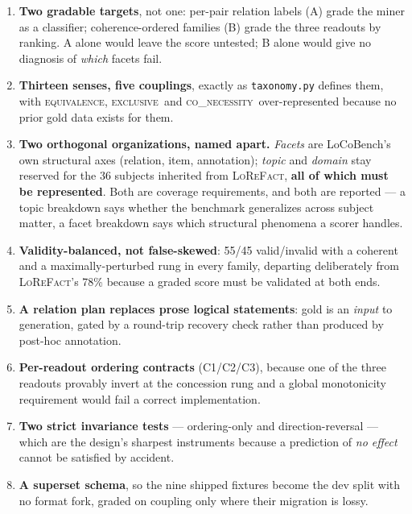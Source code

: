 \documentclass[11pt]{article}
\newcommand{\cEqv}{\textsc{equivalence}}
\newcommand{\cExc}{\textsc{exclusive}}
\newcommand{\cCoN}{\textsc{co\_necessity}}
\begin{document}
\begin{enumerate}[leftmargin=*,nosep,label=\arabic*.]
  \item \textbf{Two gradable targets}, not one: per-pair relation labels (A) grade the miner as
        a classifier; coherence-ordered families (B) grade the three readouts by ranking. A
        alone would leave the score untested; B alone would give no diagnosis of \emph{which}
        facets fail.
  \item \textbf{Thirteen senses, five couplings}, exactly as \texttt{taxonomy.py} defines them,
        with \cEqv, \cExc\ and \cCoN\ over-represented because no prior gold data exists for
        them.
  \item \textbf{Two orthogonal organizations, named apart.} \emph{Facets} are LoCoBench's own
        structural axes (relation, item, annotation); \emph{topic} and \emph{domain} stay
        reserved for the 36 subjects inherited from \textsc{LoReFact}, \textbf{all of which must
        be represented}. Both are coverage requirements, and both are reported --- a
        topic breakdown says whether the benchmark generalizes across subject matter, a facet
        breakdown says which structural phenomena a scorer handles.
  \item \textbf{Validity-balanced, not false-skewed}: 55/45 valid/invalid with a coherent and a
        maximally-perturbed rung in every family, departing deliberately from
        \textsc{LoReFact}'s 78\% because a graded score must be validated at both ends.
  \item \textbf{A relation plan replaces prose logical statements}: gold is an \emph{input} to
        generation, gated by a round-trip recovery check rather than produced by post-hoc
        annotation.
  \item \textbf{Per-readout ordering contracts} (C1/C2/C3), because one of the three readouts
        provably invert at the concession rung and a global monotonicity requirement would fail
        a correct implementation.
  \item \textbf{Two strict invariance tests} --- ordering-only and direction-reversal --- which
        are the design's sharpest instruments because a prediction of \emph{no effect} cannot be
        satisfied by accident.
  \item \textbf{A superset schema}, so the nine shipped fixtures become the dev split with no
        format fork, graded on coupling only where their migration is lossy.
\end{enumerate}
\end{document}
